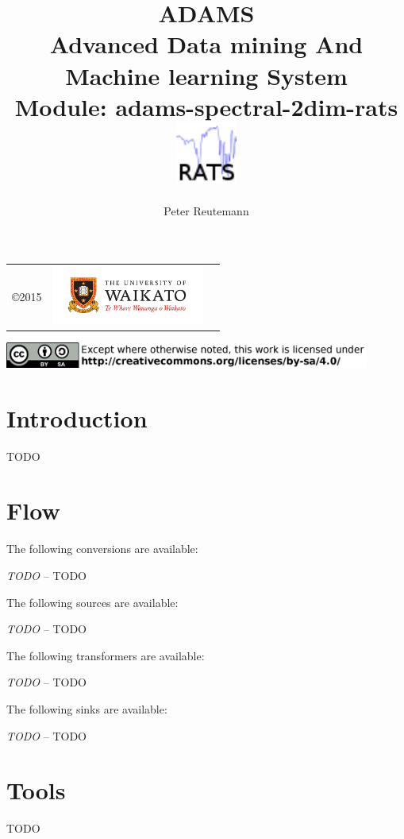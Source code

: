 \documentclass[a4paper]{book}
\title{
  \textbf{ADAMS} \\
  {\Large \textbf{A}dvanced \textbf{D}ata mining \textbf{A}nd \textbf{M}achine
  learning \textbf{S}ystem} \\
  {\Large Module: adams-spectral-2dim-rats} \\
  \vspace{1cm}
  \includegraphics[width=2cm]{images/spectral-2dim-rats-module.png} \\
}
\author{
  Peter Reutemann
}
\begin{document}
\begin{titlepage}
\maketitle

\thispagestyle{empty}
\center
\begin{table}[b]
	\begin{tabular}{c l l}
		\parbox[c][2cm]{2cm}{\copyright 2015} &
		\parbox[c][2cm]{5cm}{\includegraphics[width=5cm]{images/coat_of_arms.pdf}} \\
	\end{tabular}
	\includegraphics[width=12cm]{images/cc.png} \\
\end{table}

\end{titlepage}

\tableofcontents
\listoffigures

\chapter{Introduction}
TODO

\chapter{Flow}
The following conversions are available:
\begin{tight_itemize}
  	\item \textit{TODO} -- TODO
\end{tight_itemize}
The following sources are available:
\begin{tight_itemize}
  	\item \textit{TODO} -- TODO
\end{tight_itemize}
The following transformers are available:
\begin{tight_itemize}
  	\item \textit{TODO} -- TODO
\end{tight_itemize}
The following sinks are available:
\begin{tight_itemize}
  	\item \textit{TODO} -- TODO
\end{tight_itemize}

\chapter{Tools}
TODO


\end{document}

